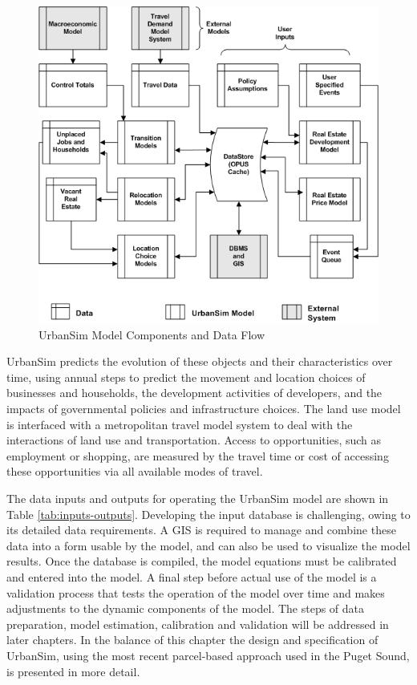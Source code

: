\begin{figure}[htp]
\begin{center}
\includegraphics[scale=0.7]{graphics/flow-2008.png}
\end{center}
\caption{UrbanSim Model Components and Data Flow}
\label{fig:dataflow}
\end{figure}

UrbanSim predicts the evolution of these objects and their characteristics over time, using annual steps to predict the movement and location choices of businesses and households, the development activities of developers, and the impacts of governmental policies and infrastructure choices.  The land use model is interfaced with a metropolitan travel model system to deal with the interactions of land use and transportation. Access to opportunities, such as employment or shopping, are measured by the travel time or cost of accessing these opportunities via all available modes of travel.

The data inputs and outputs for operating the UrbanSim model are shown in Table \ref{tab:inputs-outputs}.  Developing the input database is challenging, owing to its detailed data requirements.  A GIS is required to manage and combine these data into a form usable by the model, and can also be used to visualize the model results.  Once the database is compiled, the model equations must be calibrated and entered into the model.  A final step before actual use of the model is a validation process that tests the operation of the model over time and makes adjustments to the dynamic components of the model.  The steps of data preparation, model estimation, calibration and validation will be addressed in later chapters.  In the balance of this chapter the design and specification of UrbanSim, using the most recent parcel-based approach used in the Puget Sound, is presented in more detail.


